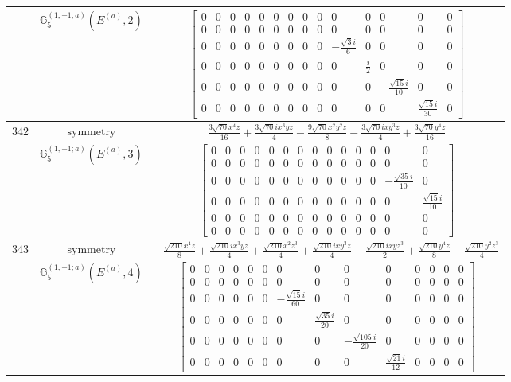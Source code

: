 \documentclass[fleqn,8pt,landscape]{jsarticle}
\begin{document}
\begin{longtable}{ccc}
$  $ & $ \mathbb{G}_{5}^{(1,-1;a)}(E^{(a)},2) $ & $ \begin{bmatrix} 0 & 0 & 0 & 0 & 0 & 0 & 0 & 0 & 0 & 0 & 0 & 0 & 0 & 0 \\ 0 & 0 & 0 & 0 & 0 & 0 & 0 & 0 & 0 & 0 & 0 & 0 & 0 & 0 \\ 0 & 0 & 0 & 0 & 0 & 0 & 0 & 0 & 0 & - \frac{\sqrt{3} i}{6} & 0 & 0 & 0 & 0 \\ 0 & 0 & 0 & 0 & 0 & 0 & 0 & 0 & 0 & 0 & \frac{i}{2} & 0 & 0 & 0 \\ 0 & 0 & 0 & 0 & 0 & 0 & 0 & 0 & 0 & 0 & 0 & - \frac{\sqrt{15} i}{10} & 0 & 0 \\ 0 & 0 & 0 & 0 & 0 & 0 & 0 & 0 & 0 & 0 & 0 & 0 & \frac{\sqrt{15} i}{30} & 0 \end{bmatrix} $ \\ \hline
$ 342 $ & $ \text{symmetry} $ & $ \frac{3 \sqrt{70} x^{4} z}{16} + \frac{3 \sqrt{70} i x^{3} y z}{4} - \frac{9 \sqrt{70} x^{2} y^{2} z}{8} - \frac{3 \sqrt{70} i x y^{3} z}{4} + \frac{3 \sqrt{70} y^{4} z}{16} $ \\
$  $ & $ \mathbb{G}_{5}^{(1,-1;a)}(E^{(a)},3) $ & $ \begin{bmatrix} 0 & 0 & 0 & 0 & 0 & 0 & 0 & 0 & 0 & 0 & 0 & 0 & 0 & 0 \\ 0 & 0 & 0 & 0 & 0 & 0 & 0 & 0 & 0 & 0 & 0 & 0 & 0 & 0 \\ 0 & 0 & 0 & 0 & 0 & 0 & 0 & 0 & 0 & 0 & 0 & 0 & - \frac{\sqrt{35} i}{10} & 0 \\ 0 & 0 & 0 & 0 & 0 & 0 & 0 & 0 & 0 & 0 & 0 & 0 & 0 & \frac{\sqrt{15} i}{10} \\ 0 & 0 & 0 & 0 & 0 & 0 & 0 & 0 & 0 & 0 & 0 & 0 & 0 & 0 \\ 0 & 0 & 0 & 0 & 0 & 0 & 0 & 0 & 0 & 0 & 0 & 0 & 0 & 0 \end{bmatrix} $ \\ \hline
$ 343 $ & $ \text{symmetry} $ & $ - \frac{\sqrt{210} x^{4} z}{8} + \frac{\sqrt{210} i x^{3} y z}{4} + \frac{\sqrt{210} x^{2} z^{3}}{4} + \frac{\sqrt{210} i x y^{3} z}{4} - \frac{\sqrt{210} i x y z^{3}}{2} + \frac{\sqrt{210} y^{4} z}{8} - \frac{\sqrt{210} y^{2} z^{3}}{4} $ \\
$  $ & $ \mathbb{G}_{5}^{(1,-1;a)}(E^{(a)},4) $ & $ \begin{bmatrix} 0 & 0 & 0 & 0 & 0 & 0 & 0 & 0 & 0 & 0 & 0 & 0 & 0 & 0 \\ 0 & 0 & 0 & 0 & 0 & 0 & 0 & 0 & 0 & 0 & 0 & 0 & 0 & 0 \\ 0 & 0 & 0 & 0 & 0 & 0 & - \frac{\sqrt{15} i}{60} & 0 & 0 & 0 & 0 & 0 & 0 & 0 \\ 0 & 0 & 0 & 0 & 0 & 0 & 0 & \frac{\sqrt{35} i}{20} & 0 & 0 & 0 & 0 & 0 & 0 \\ 0 & 0 & 0 & 0 & 0 & 0 & 0 & 0 & - \frac{\sqrt{105} i}{20} & 0 & 0 & 0 & 0 & 0 \\ 0 & 0 & 0 & 0 & 0 & 0 & 0 & 0 & 0 & \frac{\sqrt{21} i}{12} & 0 & 0 & 0 & 0 \end{bmatrix} $ \\ \hline

\end{longtable}
\end{document}
